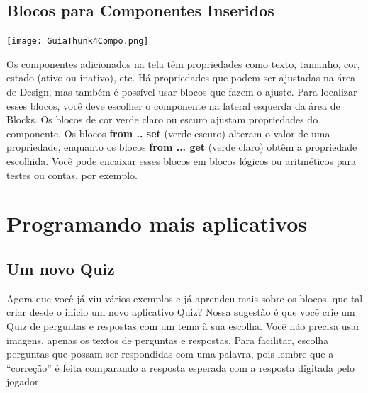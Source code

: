 \documentclass[11pt,fleqn]{book} %
\begin{document}

\section{Blocos para Componentes Inseridos}

\begin{minipage}{0.5\textwidth}
	\texttt{[image: GuiaThunk4Compo.png]}
\end{minipage}
\hfill
\begin{minipage}{0.45\textwidth}\raggedright
	Os componentes adicionados
	na tela têm propriedades como texto, tamanho,
	cor, estado (ativo ou inativo), etc. Há propriedades que podem ser ajustadas na área de Design, mas também é possível usar blocos que fazem o ajuste. Para localizar esses blocos, você deve escolher o componente na lateral esquerda da área de Blocks. Os blocos de cor verde claro ou escuro ajustam propriedades do componente. Os blocos \textbf{from .. set} (verde escuro) alteram o valor de uma propriedade, enquanto os blocos \textbf{from ... get} (verde claro) obtêm a propriedade escolhida. Você pode encaixar esses blocos em blocos lógicos
	ou aritméticos para testes ou contas, por exemplo.
	\end{minipage}


\chapter{Programando mais aplicativos}\label{ch:mais}

\section{Um novo Quiz}

Agora que você já viu vários exemplos e já aprendeu mais sobre os blocos, que tal criar desde o início um novo aplicativo Quiz?  Nossa sugestão é que você crie um Quiz de perguntas e respostas com um tema à sua escolha. Você não precisa usar imagens, apenas os textos de perguntas e respostas. Para facilitar, escolha perguntas que possam ser respondidas com uma palavra, pois lembre que a ``correção'' é feita comparando a resposta esperada com a resposta digitada pelo jogador.
\end{document}
